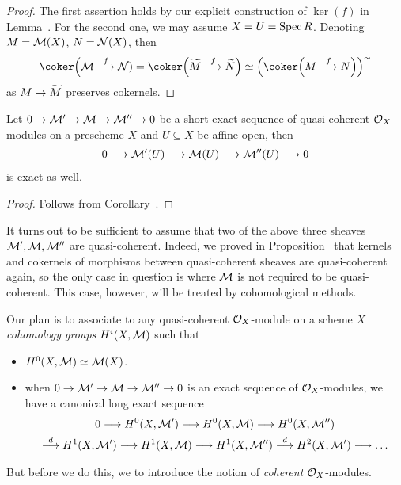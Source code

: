 \documentclass[a4paper,parskip=half,numbers=enddot, DIV=12]{scrreprt}
\begin{document}
\begin{proof}
	The first assertion holds by our explicit construction of $\ker(f)$ in Lemma~. For the second one, we may assume $X=U=\operatorname{Spec} R$. Denoting $M=\mathcal{M}(X)$, $N=\mathcal{N}(X)$, then
	\begin{align*}
		\coker\Big(\Mm\morphism[f]\Nn)=\coker\Big(\snake{M}\morphism[f]\snake{N}\Big)\simeq\Big(\coker\Big(M\morphism[f]N\Big)\Big)^\sim
	\end{align*}
	as $M\mapsto\snake{M}$ preserves cokernels.
\end{proof}
\begin{cor}
	Let $0\morphism\Mm'\morphism\Mm\morphism\Mm''\morphism0$ be a short exact sequence of quasi-coherent $\mathcal{O}_X$-modules on a prescheme $X$ and $U\subseteq X$ be affine open, then 
	\begin{align*}
		0\morphism\Mm'(U)\morphism\Mm(U)\morphism\Mm''(U)\morphism 0
	\end{align*}
	is exact as well.
\end{cor}
\begin{proof}
	Follows from Corollary~.
\end{proof}
\begin{rem*}
	It turns out to be sufficient to assume that two of the above three sheaves $\mathcal{M}',\mathcal{M},\mathcal{M}''$ are quasi-coherent. Indeed, we proved in Proposition~ that kernels and cokernels of morphisms between quasi-coherent sheaves are quasi-coherent again, so the only case in question is where $\mathcal{M}$ is not required to be quasi-coherent. This case, however, will be treated by cohomological methods.
\end{rem*}
Our plan is to associate to any quasi-coherent $\mathcal{O}_X$-module on a scheme $X$ \emph{cohomology groups} $H^i(X,\mathcal{M})$ such that
\begin{itemize}
	\item $H^0(X,\mathcal{M})\simeq\mathcal{M}(X)$.
	\item when $0\morphism\Mm'\morphism\Mm\morphism\Mm''\morphism0$ is an exact sequence of $\mathcal{O}_X$-modules, we have a canonical long exact sequence
	\begin{multline*}
		0\morphism H^0(X,\Mm')\morphism H^0(X,\Mm)\morphism H^0(X,\Mm'')\\
		\morphism[d] H^1(X,\Mm')\morphism H^1(X,\Mm)\morphism H^1(X,\Mm'')\morphism[d]H^2(X,\Mm')\morphism\ldots
	\end{multline*}
\end{itemize}
But before we do this, we to introduce the notion of \emph{coherent} $\mathcal{O}_X$-modules.
\end{document}

